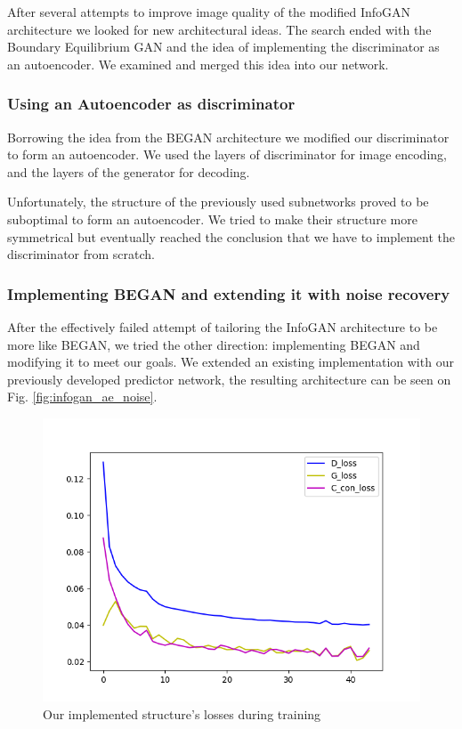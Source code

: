\documentclass{egpubl}
\begin{document}
After several attempts to improve image quality of the modified InfoGAN architecture we looked for new architectural ideas. The search ended with the Boundary Equilibrium GAN and the idea of implementing the discriminator as an autoencoder. We examined and merged this idea into our network.

\subsubsection{Using an Autoencoder as discriminator}

Borrowing the idea from the BEGAN architecture we modified our discriminator to form an autoencoder. We used the layers of discriminator for image encoding, and the layers of the generator for decoding. 

Unfortunately, the structure of the previously used subnetworks proved to be suboptimal to form an autoencoder. We tried to make their structure more symmetrical but eventually reached the conclusion that we have to implement the discriminator from scratch.

\subsubsection{Implementing BEGAN and extending it with noise recovery}

After the effectively failed attempt of tailoring the InfoGAN architecture to be more like BEGAN, we tried the other direction: implementing BEGAN and modifying it to meet our goals. We extended an existing implementation with our previously developed predictor network, the resulting architecture can be seen on Fig. \ref{fig:infogan_ae_noise}.

\begin{figure}[!htb]
	\centering
	\includegraphics[width=\linewidth]{pic/InfoBegan(proper)}
	\caption{Our implemented structure's losses during training}
	
\end{figure}
\end{document}
